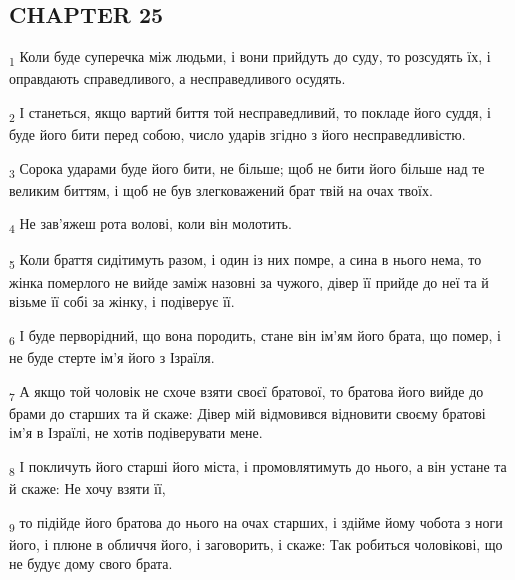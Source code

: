 \subsection{CHAPTER 25}
\begin{tcolorbox}
\textsubscript{1} Коли буде суперечка між людьми, і вони прийдуть до суду, то розсудять їх, і оправдають справедливого, а несправедливого осудять.
\end{tcolorbox}
\begin{tcolorbox}
\textsubscript{2} І станеться, якщо вартий биття той несправедливий, то покладе його суддя, і буде його бити перед собою, число ударів згідно з його несправедливістю.
\end{tcolorbox}
\begin{tcolorbox}
\textsubscript{3} Сорока ударами буде його бити, не більше; щоб не бити його більше над те великим биттям, і щоб не був злегковажений брат твій на очах твоїх.
\end{tcolorbox}
\begin{tcolorbox}
\textsubscript{4} Не зав'яжеш рота волові, коли він молотить.
\end{tcolorbox}
\begin{tcolorbox}
\textsubscript{5} Коли браття сидітимуть разом, і один із них помре, а сина в нього нема, то жінка померлого не вийде заміж назовні за чужого, дівер її прийде до неї та й візьме її собі за жінку, і подіверує її.
\end{tcolorbox}
\begin{tcolorbox}
\textsubscript{6} І буде перворідний, що вона породить, стане він ім'ям його брата, що помер, і не буде стерте ім'я його з Ізраїля.
\end{tcolorbox}
\begin{tcolorbox}
\textsubscript{7} А якщо той чоловік не схоче взяти своєї братової, то братова його вийде до брами до старших та й скаже: Дівер мій відмовився відновити своєму братові ім'я в Ізраїлі, не хотів подіверувати мене.
\end{tcolorbox}
\begin{tcolorbox}
\textsubscript{8} І покличуть його старші його міста, і промовлятимуть до нього, а він устане та й скаже: Не хочу взяти її,
\end{tcolorbox}
\begin{tcolorbox}
\textsubscript{9} то підійде його братова до нього на очах старших, і здійме йому чобота з ноги його, і плюне в обличчя його, і заговорить, і скаже: Так робиться чоловікові, що не будує дому свого брата.
\end{tcolorbox}
